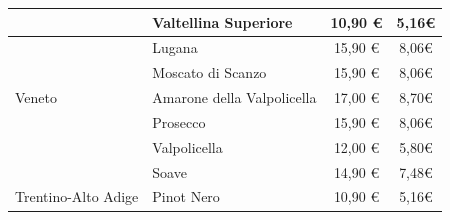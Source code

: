 \documentclass[12pt, a4paper]{article}
\begin{document}
\begin{longtable}{@{}|l|l|c|c|}
                         & Valtellina Superiore                                                      & 10,90 €                                                         & 5,16€                                                                                                         \\ \hline
                         & Lugana                                                                    & 15,90 €                                                         & 8,06€                                                                                                         \\ \hline
                         & Moscato di Scanzo                                                         & 15,90 €                                                         & 8,06€                                                                                                         \\ \hline
    Veneto               & Amarone della Valpolicella                                                & 17,00 €                                                         & 8,70€                                                                                                         \\ \hline
                         & Prosecco                                                                  & 15,90 €                                                         & 8,06€                                                                                                         \\ \hline
                         & Valpolicella                                                              & 12,00 €                                                         & 5,80€                                                                                                         \\ \hline
                         & Soave                                                                     & 14,90 €                                                         & 7,48€                                                                                                         \\ \hline
    Trentino-Alto Adige  & Pinot Nero                                                                & 10,90 €                                                         & 5,16€                                                                                                         \\ \hline

\end{longtable}
\end{document}
